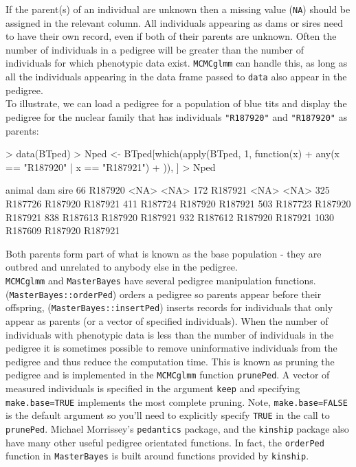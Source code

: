 \documentclass{article}
\begin{document}
If the parent(s) of an individual are unknown then a missing value (\texttt{NA}) should be assigned in the relevant column. All individuals appearing as dams or sires need to have their own record, even if both of their parents are unknown. Often the number of individuals in a pedigree will be greater than the number of individuals for which phenotypic data exist. \texttt{MCMCglmm} can handle this, as long as all the individuals appearing in the data frame passed to \texttt{data} also appear in the pedigree.\\
   
To illustrate, we can load a pedigree for a population of blue tits and display the pedigree for the nuclear family that has individuals \texttt{"R187920"} and \texttt{"R187920"} as parents:

\begin{Schunk}
\begin{Sinput}
> data(BTped)
> Nped <- BTped[which(apply(BTped, 1, function(x) {
+     any(x == "R187920" | x == "R187921")
+ })), ]
> Nped
\end{Sinput}
\begin{Soutput}
      animal     dam    sire
66   R187920    <NA>    <NA>
172  R187921    <NA>    <NA>
325  R187726 R187920 R187921
411  R187724 R187920 R187921
503  R187723 R187920 R187921
838  R187613 R187920 R187921
932  R187612 R187920 R187921
1030 R187609 R187920 R187921
\end{Soutput}
\end{Schunk}

Both parents form part of what is known as the base population - they are outbred and unrelated to anybody else in the pedigree.\\

\texttt{MCMCglmm} and \texttt{MasterBayes} have several pedigree manipulation functions. (\texttt{MasterBayes::orderPed})  orders a pedigree so parents appear before their offspring, (\texttt{MasterBayes::insertPed}) inserts records for individuals that only appear as parents (or a vector of specified individuals).  When the number of individuals with phenotypic data is less than the number of individuals in the pedigree it is sometimes possible to remove uninformative individuals from the pedigree and thus reduce the computation time. This is known as pruning the pedigree and is implemented in the  \texttt{MCMCglmm} function \texttt{prunePed}. A vector of measured individuals is specified in the argument \texttt{keep} and specifying \texttt{make.base=TRUE} implements the most complete pruning. Note,  \texttt{make.base=FALSE} is the default argument so you'll need to explicitly specify \texttt{TRUE} in the call to  \texttt{prunePed}. Michael Morrissey's \texttt{pedantics} package, and the \texttt{kinship} package also have many other useful pedigree orientated functions. In fact, the \texttt{orderPed} function in \texttt{MasterBayes} is built around functions provided by  \texttt{kinship}.\\
\end{document}
